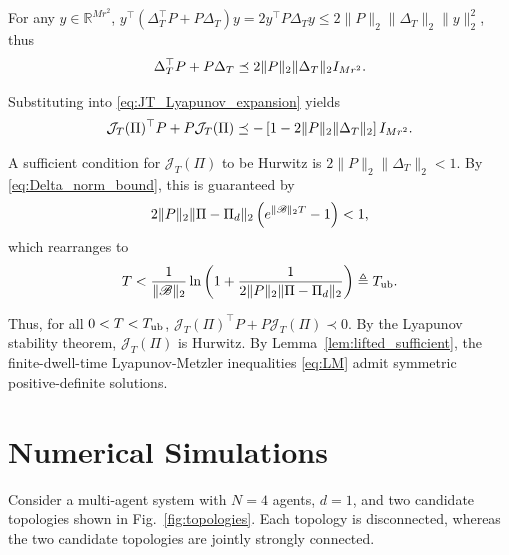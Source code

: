 \documentclass[conference]{IEEEtran}
\begin{document}
\begin{IEEEproof}
		For any $y\in\mathbb{R}^{Mr^2}$,
		$y^\top(\Delta_T^\top P + P\Delta_T)y = 2y^\top P\Delta_T y \leq 2\|P\|_2\|\Delta_T\|_2\|y\|_2^2$, thus
		\vspace{-0.2\baselineskip}
		\[
		\Delta_T^\top P + P\Delta_T \preceq 2\|P\|_2\|\Delta_T\|_2 I_{Mr^2}.
		\vspace{-0.2\baselineskip}
		\]
		
		Substituting into \eqref{eq:JT_Lyapunov_expansion} yields
		\vspace{-0.2\baselineskip}
		\begin{equation}
			\mathcal{J}_T(\Pi)^\top P + P\mathcal{J}_T(\Pi)
			\preceq
			-
			\left[
			1
			-
			2\|P\|_2
			\|\Delta_T\|_2
			\right]
			I_{Mr^2}.
			\label{eq:JT_Lyapunov_bound}
			\vspace{-0.2\baselineskip}
		\end{equation}
		
		A sufficient condition for $\mathcal{J}_T (\Pi)$ to be Hurwitz is $2\|P\|_2\|\Delta_T\|_2 < 1$.
		By \eqref{eq:Delta_norm_bound}, this is guaranteed by
		\vspace{-0.2\baselineskip}
		\[
		2\|P\|_2
		\|\Pi-\Pi_d\|_2
		\left(
		e^{\|\mathscr{B}\|_2 T}
		-
		1
		\right)
		<1,
		\vspace{-0.2\baselineskip}
		\]
		which rearranges to
		\vspace{-0.2\baselineskip}
		\[
		T
		<
		\frac{1}{\|\mathscr{B}\|_2}
		\ln
		\left(
		1
		+
		\frac{1}{
			2\|P\|_2
			\|\Pi-\Pi_d\|_2
		}
		\right)
		\triangleq
		T_{\rm ub}.
		\vspace{-0.2\baselineskip}
		\]
		
		Thus, for all $0<T<T_{\rm ub}$, $\mathcal{J}_T(\Pi)^\top P + P\mathcal{J}_T(\Pi) \prec 0$. By the Lyapunov stability theorem, $\mathcal{J}_T(\Pi)$ is Hurwitz.
		By Lemma~\ref{lem:lifted_sufficient}, the finite-dwell-time Lyapunov-Metzler inequalities \eqref{eq:LM} admit symmetric positive-definite solutions.
	\end{IEEEproof}
	
	\section{Numerical Simulations}
	
	Consider a multi-agent system with $N=4$ agents, $d=1$, and two
	candidate topologies shown in Fig.~\ref{fig:topologies}. Each topology is disconnected, whereas the two candidate
	topologies are jointly strongly connected.
	
\end{document}
